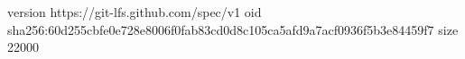 version https://git-lfs.github.com/spec/v1
oid sha256:60d255cbfe0e728e8006f0fab83cd0d8c105ca5afd9a7acf0936f5b3e84459f7
size 22000
